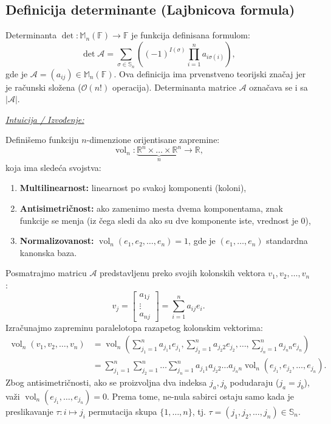 \documentclass[a4paper,12pt,twoside]{report}
\numberwithin{algorithm}{section}
\begin{document}
\subsection{Definicija determinante (Lajbnicova formula)}
Determinanta $\operatorname{det}: \mathbb{M}_n(\mathbb{F}) \to \mathbb{F}$ je funkcija definisana formulom:
\[ 
\det \mathcal{A} = \sum_{\sigma \in \mathbb{S}_n} \left((-1)^{I(\sigma)} \prod_{i = 1}^{n}a_{i \sigma(i)}\right), 
\]
gde je $\mathcal{A} = (a_{ij}) \in \mathbb{M}_{n}(\mathbb{F})$. Ova definicija ima prvenstveno teorijski značaj jer je računski složena ($\mathcal{O}(n!)$ operacija). Determinanta matrice $\mathcal{A}$ označava se i sa $|\mathcal{A}|$.

\medskip
\noindent\underline{\textit{Intuicija / Izvođenje:}} 

\medskip

Definišemo funkciju $n$-dimenzione orijentisane zapremine:
\[
\operatorname{vol}_n: \underbrace{\mathbb{R}^n \times \dots \times \mathbb{R}^n}_n \to \mathbb{R},
\]
koja ima sledeća svojstva:
\begin{enumerate}
    \item \textbf{Multilinearnost:} linearnost po svakoj komponenti (koloni),
    \item \textbf{Antisimetričnost:} ako zamenimo mesta dvema komponentama, znak funkcije se menja (iz čega sledi da ako su dve komponente iste, vrednost je $0$),
    \item \textbf{Normalizovanost:} $\operatorname{vol}_n(e_1, e_2, \dots, e_n) = 1$, gde je $(e_1, \dots, e_n)$ standardna kanonska baza.
\end{enumerate}

Posmatrajmo matricu $\mathcal{A}$ predstavljenu preko svojih kolonskih vektora $v_1, v_2, \dots, v_n$:
\[
v_j = \begin{bmatrix} a_{1j} \\ \vdots \\ a_{nj} \end{bmatrix} = \sum_{i=1}^n a_{ij} e_i.
\]
Izračunajmo zapreminu paralelotopa razapetog kolonskim vektorima:
\[
\begin{aligned}
\operatorname{vol}_n (v_1, v_2, \dots, v_n) &= \operatorname{vol}_n \left( \sum_{j_1=1}^n a_{j_1 1} e_{j_1}, \sum_{j_2=1}^n a_{j_2 2} e_{j_2}, \dots, \sum_{j_n=1}^n a_{j_n n} e_{j_n} \right) \\
&= \sum_{j_1 = 1}^{n} \sum_{j_2 = 1}^{n} \dots \sum_{j_n=1}^{n} a_{j_1 1} a_{j_2 2} \dots a_{j_n n} \operatorname{vol}_n (e_{j_1}, e_{j_2}, \dots, e_{j_n}).
\end{aligned}
\]
Zbog antisimetričnosti, ako se proizvoljna dva indeksa $j_a, j_b$ podudaraju ($j_a = j_b$), važi $\operatorname{vol}_n(e_{j_1}, \dots, e_{j_n}) = 0$. Prema tome, ne-nula sabirci ostaju samo kada je preslikavanje $\tau: i \mapsto j_i$ permutacija skupa $\{1, \dots, n\}$, tj. $\tau = (j_1, j_2, \dots, j_n) \in \mathbb{S}_n$.
\end{document}

